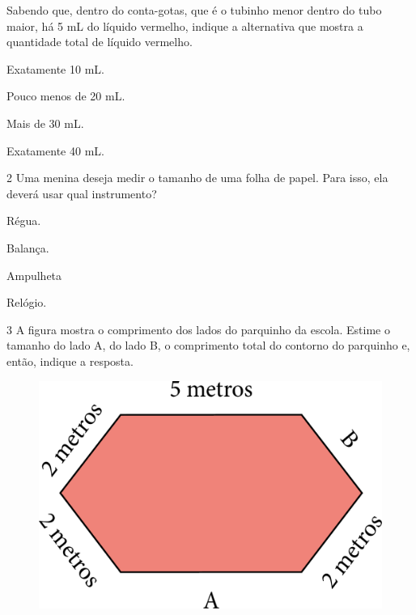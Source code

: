 Sabendo que, dentro do conta-gotas, que é o tubinho menor dentro do tubo
maior, há 5 mL do líquido vermelho, indique a alternativa que mostra a
quantidade total de líquido vermelho.

\begin{escolha}[itemsep=-5pt]
\item Exatamente 10 mL.

\item Pouco menos de 20 mL.

\item Mais de 30 mL.

\item Exatamente 40 mL.
\end{escolha}

\num{2} Uma menina deseja medir o tamanho de uma folha de papel. Para isso, ela deverá usar qual instrumento?


\begin{escolha}[itemsep=-5pt]
\item Régua.

\item Balança.

\item Ampulheta

\item Relógio.
\end{escolha}

\num{3} A figura mostra o comprimento dos lados do parquinho da escola.
Estime o tamanho do lado A, do lado B, o comprimento total do contorno
do parquinho e, então, indique a resposta.

\begin{figure}[H]
\centering
\includegraphics[width=.6\textwidth]{./media/image47.png}
\end{figure}

